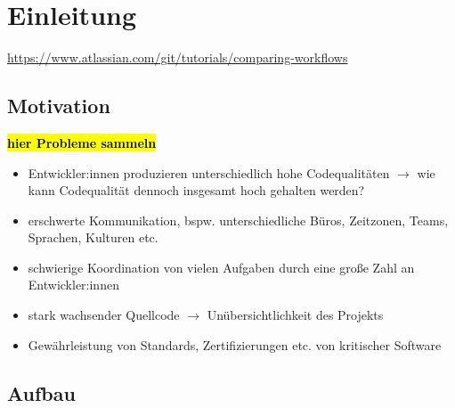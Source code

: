 
\setcounter{page}{1}

\section{Einleitung}
\label{sec:einleitung}

\lipsum[1]

\url{https://www.atlassian.com/git/tutorials/comparing-workflows}




\subsection{Motivation}
\label{sec:einleitung:motivation}

\hl{\textbf{hier Probleme sammeln}}

\begin{itemize}
    \item Entwickler:innen produzieren unterschiedlich hohe Codequalitäten $\to$ wie kann Codequalität dennoch insgesamt hoch gehalten werden?
    \item erschwerte Kommunikation, bspw. unterschiedliche Büros, Zeitzonen, Teams, Sprachen, Kulturen etc.
    \item schwierige Koordination von vielen Aufgaben durch eine große Zahl an Entwickler:innen
    \item stark wachsender Quellcode $\to$ Unübersichtlichkeit des Projekts
    \item Gewährleistung von Standards, Zertifizierungen etc. von kritischer Software
\end{itemize}




\subsection{Aufbau}
\label{sec:einleitung:aufbau}

\lipsum[3]
